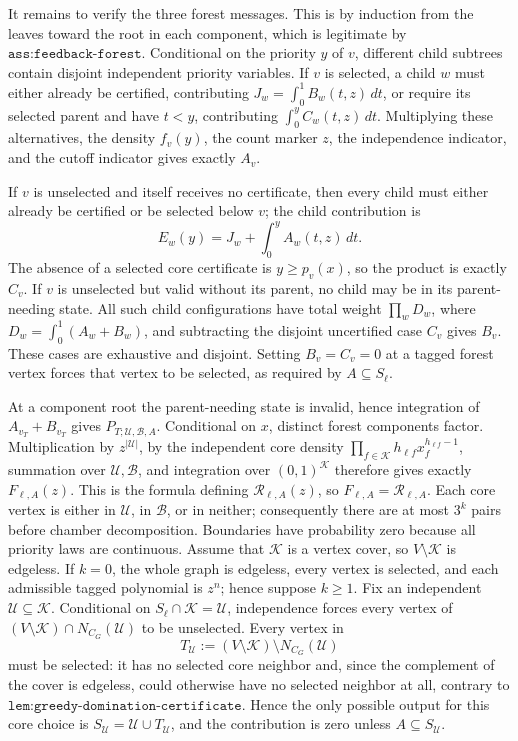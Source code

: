 It remains to verify the three forest messages.  This is by induction from the leaves toward the root in each component, which is legitimate by \(\texttt{ass:feedback-forest}\).  Conditional on the priority \(y\) of \(v\), different child subtrees contain disjoint independent priority variables.  If \(v\) is selected, a child \(w\) must either already be certified, contributing \(J_w=\int_0^1B_w(t,z)\,dt\), or require its selected parent and have \(t<y\), contributing \(\int_0^yC_w(t,z)\,dt\).  Multiplying these alternatives, the density \(f_v(y)\), the count marker \(z\), the independence indicator, and the cutoff indicator gives exactly \(A_v\).

If \(v\) is unselected and itself receives no certificate, then every child must either already be certified or be selected below \(v\); the child contribution is
\[
 E_w(y)=J_w+\int_0^yA_w(t,z)\,dt.
\]
The absence of a selected core certificate is \(y\ge p_v(x)\), so the product is exactly \(C_v\).  If \(v\) is unselected but valid without its parent, no child may be in its parent-needing state.  All such child configurations have total weight \(\prod_wD_w\), where \(D_w=\int_0^1(A_w+B_w)\), and subtracting the disjoint uncertified case \(C_v\) gives \(B_v\).  These cases are exhaustive and disjoint.  Setting \(B_v=C_v=0\) at a tagged forest vertex forces that vertex to be selected, as required by \(A\subseteq S_\ell\).

At a component root the parent-needing state is invalid, hence integration of \(A_{v_T}+B_{v_T}\) gives \(P_{T;\mathcal U,\mathcal B,A}\).  Conditional on \(x\), distinct forest components factor.  Multiplication by \(z^{|\mathcal U|}\), by the independent core density \(\prod_{f\in\mathcal K}h_{\ell f}x_f^{h_{\ell f}-1}\), summation over \(\mathcal U,\mathcal B\), and integration over \((0,1)^{\mathcal K}\) therefore gives exactly \(F_{\ell,A}(z)\).  This is the formula defining \(\mathcal R_{\ell,A}(z)\), so \(F_{\ell,A}=\mathcal R_{\ell,A}\).  Each core vertex is either in \(\mathcal U\), in \(\mathcal B\), or in neither; consequently there are at most \(3^k\) pairs before chamber decomposition.  Boundaries have probability zero because all priority laws are continuous.
Assume that \(\mathcal K\) is a vertex cover, so \(V\setminus\mathcal K\) is edgeless.  If \(k=0\), the whole graph is edgeless, every vertex is selected, and each admissible tagged polynomial is \(z^n\); hence suppose \(k\ge1\).  Fix an independent \(\mathcal U\subseteq\mathcal K\).  Conditional on \(S_\ell\cap\mathcal K=\mathcal U\), independence forces every vertex of \((V\setminus\mathcal K)\cap N_{C_G}(\mathcal U)\) to be unselected.  Every vertex in
\[
 T_{\mathcal U}:=(V\setminus\mathcal K)\setminus N_{C_G}(\mathcal U)
\]
must be selected: it has no selected core neighbor and, since the complement of the cover is edgeless, could otherwise have no selected neighbor at all, contrary to \(\texttt{lem:greedy-domination-certificate}\).  Hence the only possible output for this core choice is \(S_{\mathcal U}=\mathcal U\cup T_{\mathcal U}\), and the contribution is zero unless \(A\subseteq S_{\mathcal U}\).

